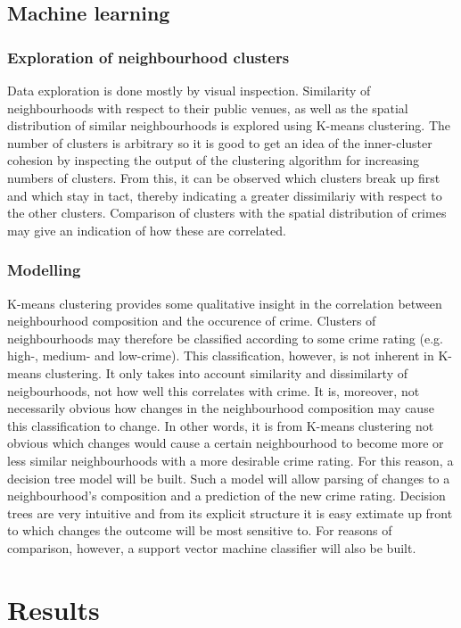 \documentclass{article}
\begin{document}
\subsection{Machine learning}
\subsubsection{Exploration of neighbourhood clusters}
Data exploration is done mostly by visual inspection. Similarity of neighbourhoods with respect to their public venues, as well as the spatial distribution of similar neighbourhoods is explored using K-means clustering. The number of clusters is arbitrary so it is good to get an idea of the inner-cluster cohesion by inspecting the output of the clustering algorithm for increasing numbers of clusters. From this, it can be observed which clusters break up first and which stay in tact, thereby indicating a greater dissimilariy with respect to the other clusters. Comparison of clusters with the spatial distribution of crimes may give an indication of how these are correlated.

\subsubsection{Modelling}
K-means clustering provides some qualitative insight in the correlation between neighbourhood composition and the occurence of crime. Clusters of neighbourhoods may therefore be classified according to some crime rating (e.g. high-, medium- and low-crime). This classification, however, is not inherent in K-means clustering. It only takes into account similarity and dissimilarty of neigbourhoods, not how well this correlates with crime. It is, moreover, not necessarily obvious how changes in the neighbourhood composition may cause this classification to change. In other words, it is from K-means clustering not obvious which changes would cause a certain neighbourhood to become more or less similar neighbourhoods with a more desirable crime rating. For this reason, a decision tree model will be built. Such a model will allow parsing of changes to a neighbourhood's composition and a prediction of the new crime rating. Decision trees are very intuitive and from its explicit structure it is easy extimate up front to which changes the outcome will be most sensitive to. For reasons of comparison, however, a support vector machine classifier will also be built.

\section{Results}
\end{document}
